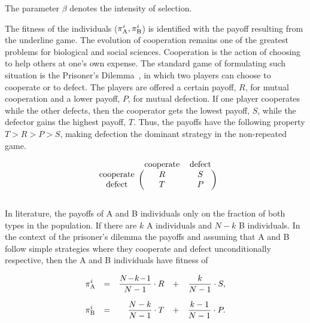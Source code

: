 \documentclass[11pt]{article}
\theoremstyle{plainCl1}
\theoremstyle{plainCl2}
\begin{document}
The parameter \(\beta\) denotes the intensity of selection.

The fitness of the individuals (\(\pi _{{\rm A}}^{i}, \pi _{{\rm B}}^{i}\)) is
identified with the payoff resulting from the underline game. The evolution of
cooperation remains one of the greatest problems for biological and social
sciences. Cooperation is the action of choosing to help others at one's own
expense. The standard game of formulating such situation is the Prisoner's
Dilemma~\cite{trivers1971evolution, milinski1987tit, glynatsi2021bibliometric,
ohtsuki2006simple}, in which two players can choose to cooperate or to defect.
The players are offered a certain payoff, \(R\), for mutual cooperation and a
lower payoff, \(P\), for mutual defection. If one player cooperates while the
other defects, then the cooperator gets the lowest payoff, \(S\), while the
defector gains the highest payoff, \(T\). Thus, the payoffs have the following
property \(T > R > P > S\), making defection the dominant strategy in the
non-repeated game.

\begin{equation}\label{eq:payoffs}
  \begin{blockarray}{ccc}
      & \text{cooperate} & \text{defect} \\
      \begin{block}{c(cc)}
          \text{cooperate} & R & S \\
          \text{defect} & T & P \\
      \end{block}
  \end{blockarray}
\end{equation}

In literature, the payoffs of A and B individuals only on the fraction of both
types in the population. If there are \(k\) A individuals and \(N-k\) B
individuals. In the context of the prisoner's dilemma the payoffs and assuming
that A and B follow simple strategies where they cooperate and defect
unconditionally respective, then the A and B individuals have fitness of

\begin{equation}
  \begin{array}{lcrcr}
  \displaystyle \pi _{{\rm A}}^{i}	&=	&\displaystyle \frac{N\!-\!k\!-\!1}{N-1}\cdot R	&+	&\displaystyle\frac{k}{N-1}\cdot S,\\[0.5cm]
  \displaystyle \pi _{{\rm B}}^{i}&=	&\displaystyle\frac{N-k}{N-1}\cdot T &+	&\displaystyle\frac{k-1}{N-1}\cdot P.\\
  \end{array}
\end{equation}
\end{document}
